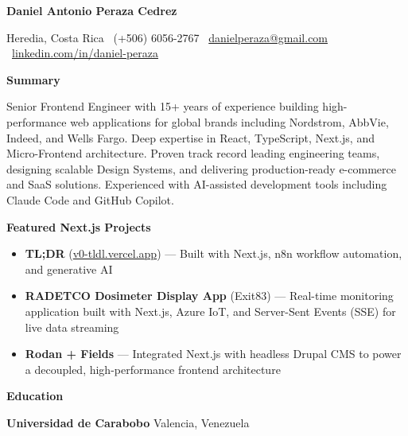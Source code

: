 \documentclass[11pt]{article}
\begin{document}
\begin{center}
    \textbf{\Large Daniel Antonio Peraza Cedrez}\\
    \hrulefill
\end{center}

\begin{center}
    Heredia, Costa Rica \textbullet\ (+506) 6056-2767 \textbullet\ \href{mailto:danielperaza@gmail.com}{danielperaza@gmail.com} \textbullet\ \href{https://linkedin.com/in/daniel-peraza}{linkedin.com/in/daniel-peraza}
\end{center}

\vspace{0.5pt}

\begin{center}
    \textbf{Summary}
\end{center}
Senior Frontend Engineer with 15+ years of experience building high-performance web applications for global brands including Nordstrom, AbbVie, Indeed, and Wells Fargo. Deep expertise in React, TypeScript, Next.js, and Micro-Frontend architecture. Proven track record leading engineering teams, designing scalable Design Systems, and delivering production-ready e-commerce and SaaS solutions. Experienced with AI-assisted development tools including Claude Code and GitHub Copilot.

\vspace{12pt}

\begin{center}
    \textbf{Featured Next.js Projects}
\end{center}
\begin{itemize}[noitemsep, topsep=0pt, partopsep=0pt, parsep=0pt]
    \item \textbf{TL;DR} (\href{https://v0-tldl.vercel.app/}{v0-tldl.vercel.app}) --- Built with Next.js, n8n workflow automation, and generative AI
    \item \textbf{RADETCO Dosimeter Display App} (Exit83) --- Real-time monitoring application built with Next.js, Azure IoT, and Server-Sent Events (SSE) for live data streaming
    \item \textbf{Rodan + Fields} --- Integrated Next.js with headless Drupal CMS to power a decoupled, high-performance frontend architecture
\end{itemize}

\vspace{12pt}

\begin{center}
    \textbf{Education}
\end{center}
\textbf{Universidad de Carabobo} \hfill Valencia, Venezuela
\end{document}
